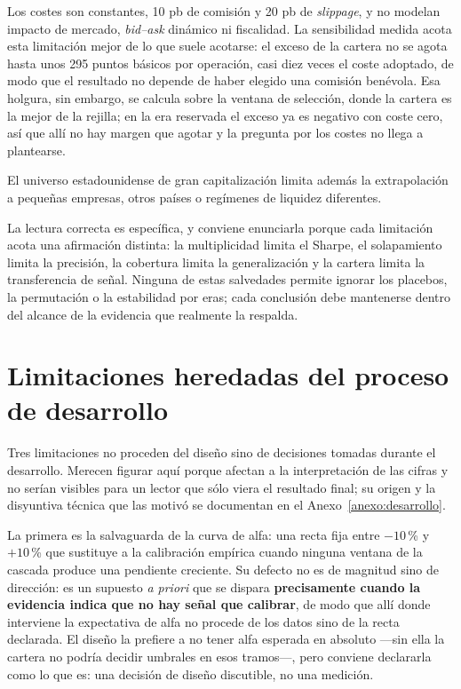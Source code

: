 Los costes son constantes, 10 pb de comisión y 20 pb de \textit{slippage}, y no modelan impacto de
mercado, \textit{bid--ask} dinámico ni fiscalidad. La sensibilidad medida acota esta limitación
mejor de lo que suele acotarse: el exceso de la cartera no se agota hasta unos 295 puntos básicos
por operación, casi diez veces el coste adoptado, de modo que el resultado no depende de haber
elegido una comisión benévola. Esa holgura, sin embargo, se calcula sobre la ventana de selección,
donde la cartera es la mejor de la rejilla; en la era reservada el exceso ya es negativo con coste
cero, así que allí no hay margen que agotar y la pregunta por los costes no llega a plantearse.

El universo estadounidense de gran capitalización limita además la extrapolación a pequeñas
empresas, otros países o regímenes de liquidez diferentes.

La lectura correcta es específica, y conviene enunciarla porque cada limitación acota una afirmación
distinta: la multiplicidad limita el Sharpe, el solapamiento limita la precisión, la cobertura limita
la generalización y la cartera limita la transferencia de señal. Ninguna de estas salvedades permite
ignorar los placebos, la permutación o la estabilidad por eras; cada conclusión debe mantenerse
dentro del alcance de la evidencia que realmente la respalda.

\section{Limitaciones heredadas del proceso de desarrollo}

Tres limitaciones no proceden del diseño sino de decisiones tomadas durante el desarrollo. Merecen
figurar aquí porque afectan a la interpretación de las cifras y no serían visibles para un lector
que sólo viera el resultado final; su origen y la disyuntiva técnica que las motivó se documentan en
el Anexo~\ref{anexo:desarrollo}.

La primera es la salvaguarda de la curva de alfa: una recta fija entre $-10$\,\% y $+10$\,\% que
sustituye a la calibración empírica cuando ninguna ventana de la cascada produce una pendiente
creciente. Su defecto no es de magnitud sino de dirección: es un supuesto \emph{a priori} que se
dispara \textbf{precisamente cuando la evidencia indica que no hay señal que calibrar}, de modo que
allí donde interviene la expectativa de alfa no procede de los datos sino de la recta declarada. El
diseño la prefiere a no tener alfa esperada en absoluto ---sin ella la cartera no podría decidir
umbrales en esos tramos---, pero conviene declararla como lo que es: una decisión de diseño
discutible, no una medición.

